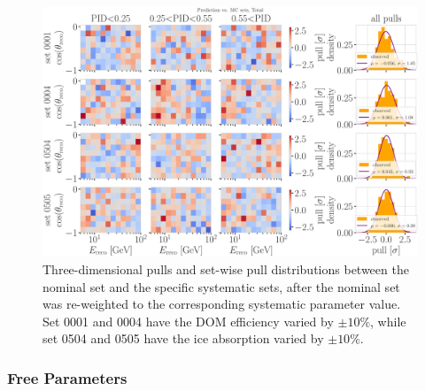 \begin{figure}[h]
    \includegraphics[width=0.9\linewidth]{figures/results/utlrasurfaces/oscNext_leptoninjector_1.0_GeV_knn_probs_neighbors_500_weighted_nfiles_extended_holeice_corrected_grads_poly_2_weighted_reference_weight_0.0100_thesis_style_subset_0-5.png}
    \caption[Detector systematic uncertainty treatment bin-wise pulls example sets]{Three-dimensional pulls and set-wise pull distributions between the nominal set and the specific systematic sets, after the nominal set was re-weighted to the corresponding systematic parameter value. Set 0001 and 0004 have the DOM efficiency varied by $\pm10\%$, while set 0504 and 0505 have the ice absorption varied by $\pm10\%$.}
\end{figure}


\subsubsection{Free Parameters} 

